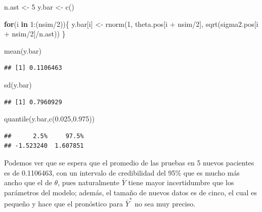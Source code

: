 \documentclass[
  10pt,
  spanish,
]{book}
\newenvironment{Shaded}{\begin{snugshade}}{\end{snugshade}}
\newcommand{\ControlFlowTok}[1]{\textcolor[rgb]{0.13,0.29,0.53}{\textbf{#1}}}
\newcommand{\DecValTok}[1]{\textcolor[rgb]{0.00,0.00,0.81}{#1}}
\newcommand{\FloatTok}[1]{\textcolor[rgb]{0.00,0.00,0.81}{#1}}
\newcommand{\FunctionTok}[1]{\textcolor[rgb]{0.00,0.00,0.00}{#1}}
\newcommand{\NormalTok}[1]{#1}
\newcommand{\OtherTok}[1]{\textcolor[rgb]{0.56,0.35,0.01}{#1}}
\newcommand{\SpecialCharTok}[1]{\textcolor[rgb]{0.00,0.00,0.00}{#1}}
\theoremstyle{definition}
\theoremstyle{definition}
\theoremstyle{definition}
\theoremstyle{definition}
\theoremstyle{remark}
\begin{document}
\begin{Shaded}
\begin{Highlighting}[]
\NormalTok{n.ast }\OtherTok{\textless{}{-}} \DecValTok{5}
\NormalTok{y.bar }\OtherTok{\textless{}{-}} \FunctionTok{c}\NormalTok{()}

\ControlFlowTok{for}\NormalTok{(i }\ControlFlowTok{in} \DecValTok{1}\SpecialCharTok{:}\NormalTok{(nsim}\SpecialCharTok{/}\DecValTok{2}\NormalTok{))\{}
\NormalTok{  y.bar[i] }\OtherTok{\textless{}{-}} \FunctionTok{rnorm}\NormalTok{(}\DecValTok{1}\NormalTok{,}
\NormalTok{                    theta.pos[i }\SpecialCharTok{+}\NormalTok{ nsim}\SpecialCharTok{/}\DecValTok{2}\NormalTok{],}
                    \FunctionTok{sqrt}\NormalTok{(sigma2.pos[i }\SpecialCharTok{+}\NormalTok{ nsim}\SpecialCharTok{/}\DecValTok{2}\NormalTok{]}\SpecialCharTok{/}\NormalTok{n.ast))}
\NormalTok{\}}

\FunctionTok{mean}\NormalTok{(y.bar)}
\end{Highlighting}
\end{Shaded}

\begin{verbatim}
## [1] 0.1106463
\end{verbatim}

\begin{Shaded}
\begin{Highlighting}[]
\FunctionTok{sd}\NormalTok{(y.bar)}
\end{Highlighting}
\end{Shaded}

\begin{verbatim}
## [1] 0.7960929
\end{verbatim}

\begin{Shaded}
\begin{Highlighting}[]
\FunctionTok{quantile}\NormalTok{(y.bar,}\FunctionTok{c}\NormalTok{(}\FloatTok{0.025}\NormalTok{,}\FloatTok{0.975}\NormalTok{))}
\end{Highlighting}
\end{Shaded}

\begin{verbatim}
##      2.5%     97.5% 
## -1.523240  1.607851
\end{verbatim}

Podemos ver que se espera que el promedio de las pruebas en 5 nuevos pacientes es de 0.1106463, con un intervalo de credibilidad del 95\% que es mucho más ancho que el de \(\theta\), pues naturalmente \(\bar{Y}\) tiene mayor incertidumbre que los parámetros del modelo; además, el tamaño de nuevos datos es de cinco, el cual es pequeño y hace que el pronóstico para \(\bar{Y}^*\) no sea muy preciso.
\end{document}

